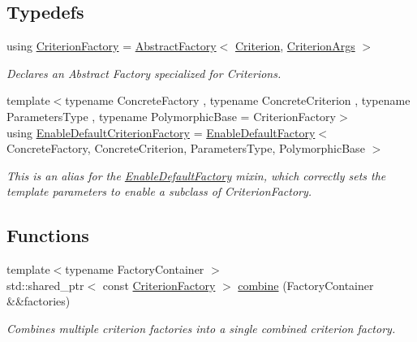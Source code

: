 \subsection*{Typedefs}
\begin{DoxyCompactItemize}
\item 
\mbox{\label{namespacegko_1_1stop_ab12a51109c50b35ec36dc5a393d6a9a0}} 
using \hyperlink{namespacegko_1_1stop_ab12a51109c50b35ec36dc5a393d6a9a0}{Criterion\+Factory} = \hyperlink{classgko_1_1AbstractFactory}{Abstract\+Factory}$<$ \hyperlink{classgko_1_1stop_1_1Criterion}{Criterion}, \hyperlink{structgko_1_1stop_1_1CriterionArgs}{Criterion\+Args} $>$
\begin{DoxyCompactList}\small\item\em Declares an Abstract Factory specialized for Criterions. \end{DoxyCompactList}\item 
{\footnotesize template$<$typename Concrete\+Factory , typename Concrete\+Criterion , typename Parameters\+Type , typename Polymorphic\+Base  = Criterion\+Factory$>$ }\\using \hyperlink{namespacegko_1_1stop_ab045b6fd7571f3234d9a63a5ee5a2252}{Enable\+Default\+Criterion\+Factory} = \hyperlink{classgko_1_1EnableDefaultFactory}{Enable\+Default\+Factory}$<$ Concrete\+Factory, Concrete\+Criterion, Parameters\+Type, Polymorphic\+Base $>$
\begin{DoxyCompactList}\small\item\em This is an alias for the \hyperlink{classgko_1_1EnableDefaultFactory}{Enable\+Default\+Factory} mixin, which correctly sets the template parameters to enable a subclass of Criterion\+Factory. \end{DoxyCompactList}\end{DoxyCompactItemize}
\subsection*{Functions}
\begin{DoxyCompactItemize}
\item 
{\footnotesize template$<$typename Factory\+Container $>$ }\\std\+::shared\+\_\+ptr$<$ const \hyperlink{namespacegko_1_1stop_ab12a51109c50b35ec36dc5a393d6a9a0}{Criterion\+Factory} $>$ \hyperlink{group__stop_ga3a3325b3a7660501f3bb72d08b09f2d2}{combine} (Factory\+Container \&\&factories)
\begin{DoxyCompactList}\small\item\em Combines multiple criterion factories into a single combined criterion factory. \end{DoxyCompactList}\end{DoxyCompactItemize}


